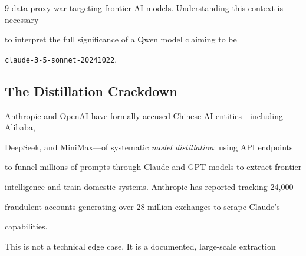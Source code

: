 \documentclass[11pt]{article}
\theoremstyle{definition}
\begin{document}
\begin{thebibliography}{9}
data proxy war targeting frontier AI models. Understanding this context is necessary





to interpret the full significance of a Qwen model claiming to be





\texttt{claude-3-5-sonnet-20241022}.











\subsection{The Distillation Crackdown}











Anthropic and OpenAI have formally accused Chinese AI entities---including Alibaba,





DeepSeek, and MiniMax---of systematic \emph{model distillation}: using API endpoints





to funnel millions of prompts through Claude and GPT models to extract frontier





intelligence and train domestic systems. Anthropic has reported tracking 24,000





fraudulent accounts generating over 28 million exchanges to scrape Claude's





capabilities.











This is not a technical edge case. It is a documented, large-scale extraction






\end{thebibliography}
\end{document}
